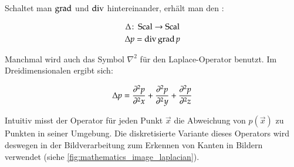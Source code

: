 Schaltet man $\operatorname*{grad}$ und $\operatorname*{div}$ hintereinander, erhält man den
:

\begin{gather}
\Delta \colon \operatorname*{Scal} \to \operatorname*{Scal} \\
\Delta p = \operatorname*{div} \operatorname*{grad} p
\end{gather}

Manchmal wird auch das Symbol $\nabla^2$ für den Laplace-Operator benutzt. Im Dreidimensionalen ergibt sich:

\begin{equation}
\Delta p =
\frac{\partial^2 p}{\partial^2 x} +
\frac{\partial^2 p}{\partial^2 y} +
\frac{\partial^2 p}{\partial^2 z}
\end{equation}

Intuitiv misst der Operator für jeden Punkt $\vec{x}$ die Abweichung von
$p(\vec{x})$ zu Punkten in seiner Umgebung. Die diskretisierte Variante dieses
Operators wird deswegen in der Bildverarbeitung zum Erkennen von Kanten in
Bildern verwendet (siehe \autoref{fig:mathematics_image_laplacian}).

